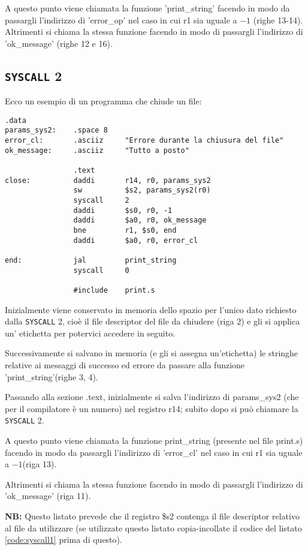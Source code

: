 \documentclass[12pt]{report}
\newcommand{\SC}{\texttt{SYSCALL}}
\newcommand{\OF}{\textbf{NB:} Questo listato prevede che il registro \$s2 contenga il file descriptor
relativo al file da utilizzare (se utilizzate questo listato copia-incollate il codice del listato \ref{code:syscall1} prima di questo).}
\begin{document}
A questo punto viene chiamata la funzione 'print\_string' facendo in modo
da passargli l'indirizzo di 'error\_op' nel caso in cui r1 sia uguale a $-1$
(righe 13-14).  Altrimenti si chiama la stessa funzione facendo in modo di
passargli l'indirizzo di 'ok\_message' (righe 12 e 16).

\subsection{\SC{} 2}
Ecco un esempio di un programma che chiude un file:
\begin{lstlisting}[caption={Esempio \SC{} 2}, label={code:syscall2}, style={mips}]
                .data
params_sys2:    .space 8
error_cl:       .asciiz     "Errore durante la chiusura del file"
ok_message:     .asciiz     "Tutto a posto"

                .text
close:          daddi       r14, r0, params_sys2        
                sw          $s2, params_sys2(r0)    
                syscall     2            
                daddi       $s0, r0, -1        
                daddi       $a0, r0, ok_message            
                bne         r1, $s0, end            
                daddi       $a0, r0, error_cl

end:            jal         print_string
                syscall     0
    
                #include    print.s         
\end{lstlisting}
Inizialmente viene conservato in memoria dello spazio per l'unico dato richiesto
dalla \SC{} 2, cio\`e  il file descriptor del file da chiudere (riga 2) e gli si
applica un' etichetta per potervici accedere in seguito.
 
Successivamente si salvano in memoria (e gli si assegna un'etichetta) le
stringhe relative ai messaggi di successo ed errore da passare alla funzione
'print\_string'(righe 3, 4).

Passando alla sezione .text, inizialmente si salva l'indirizzo di params\_sys2
(che per il compilatore \`{e} un numero) nel registro r14; subito dopo si
pu\`{o} chiamare la \SC{} 2.

A questo punto viene chiamata la funzione print\_string (presente nel file
print.s) facendo in modo da passargli l'indirizzo di 'error\_cl' nel caso in cui
r1 sia uguale a $-1$(riga 13).

Altrimenti si chiama la stessa funzione facendo in modo di passargli l'indirizzo
di 'ok\_message' (riga 11).

\OF{}
\end{document}
